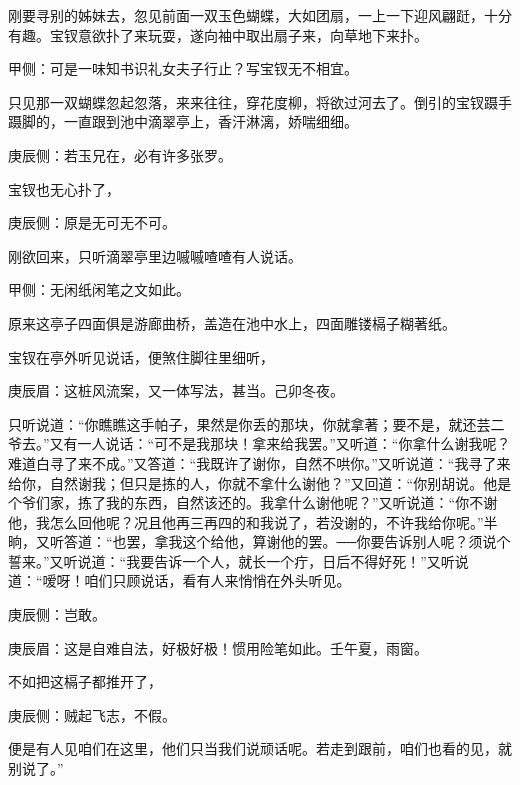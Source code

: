 \begin{parag}
    刚要寻别的姊妹去，忽见前面一双玉色蝴蝶，大如团扇，一上一下迎风翩跹，十分有趣。宝钗意欲扑了来玩耍，遂向袖中取出扇子来，向草地下来扑。\begin{note}甲侧：可是一味知书识礼女夫子行止？写宝钗无不相宜。\end{note}只见那一双蝴蝶忽起忽落，来来往往，穿花度柳，将欲过河去了。倒引的宝钗蹑手蹑脚的，一直跟到池中滴翠亭上，香汗淋漓，娇喘细细。\begin{note}庚辰侧：若玉兄在，必有许多张罗。\end{note}宝钗也无心扑了，\begin{note}庚辰侧：原是无可无不可。\end{note}刚欲回来，只听滴翠亭里边嘁嘁喳喳有人说话。\begin{note}甲侧：无闲纸闲笔之文如此。\end{note}原来这亭子四面俱是游廊曲桥，盖造在池中水上，四面雕镂槅子糊著纸。
\end{parag}


\begin{parag}
    宝钗在亭外听见说话，便煞住脚往里细听，\begin{note}庚辰眉：这桩风流案，又一体写法，甚当。己卯冬夜。\end{note}只听说道：“你瞧瞧这手帕子，果然是你丢的那块，你就拿著；要不是，就还芸二爷去。”又有一人说话：“可不是我那块！拿来给我罢。”又听道：“你拿什么谢我呢？难道白寻了来不成。”又答道：“我既许了谢你，自然不哄你。”又听说道：“我寻了来给你，自然谢我；但只是拣的人，你就不拿什么谢他？”又回道：“你别胡说。他是个爷们家，拣了我的东西，自然该还的。我拿什么谢他呢？”又听说道：“你不谢他，我怎么回他呢？况且他再三再四的和我说了，若没谢的，不许我给你呢。”半晌，又听答道：“也罢，拿我这个给他，算谢他的罢。──你要告诉别人呢？须说个誓来。”又听说道：“我要告诉一个人，就长一个疔，日后不得好死！”又听说道：“嗳呀！咱们只顾说话，看有人来悄悄在外头听见。\begin{note}庚辰侧：岂敢。\end{note}\begin{note}庚辰眉：这是自难自法，好极好极！惯用险笔如此。壬午夏，雨窗。\end{note}不如把这槅子都推开了，\begin{note}庚辰侧：贼起飞志，不假。\end{note}便是有人见咱们在这里，他们只当我们说顽话呢。若走到跟前，咱们也看的见，就别说了。”
\end{parag}


